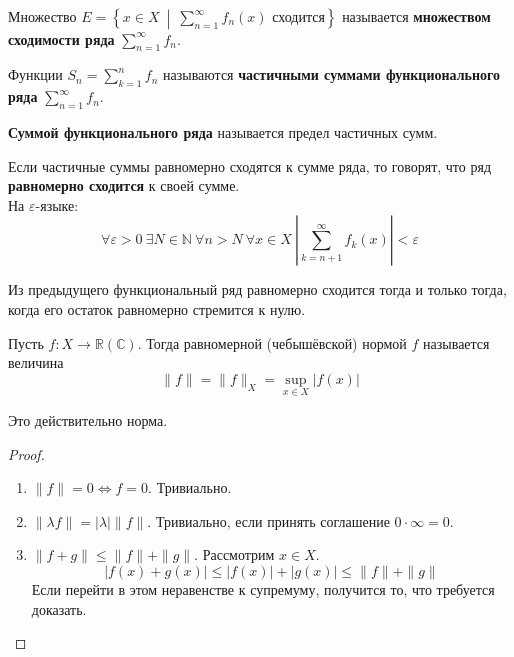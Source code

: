 \documentclass{article}
\let\eps\varepsilon
\begin{document}
    \begin{definition}
        Множество $E=\left\{x\in X~\middle|~\sum\limits_{n=1}^\infty f_n(x)\text{ сходится}\right\}$ называется \textbf{множеством сходимости ряда} $\sum\limits_{n=1}^\infty f_n$.
    \end{definition}
    \begin{definition}
        Функции $S_n=\sum\limits_{k=1}^n f_n$ называются \textbf{частичными суммами функционального ряда} $\sum\limits_{n=1}^\infty f_n$.
    \end{definition}
    \begin{definition}
        \textbf{Суммой функционального ряда} называется предел частичных сумм.
    \end{definition}
    \begin{definition}
        Если частичные суммы равномерно сходятся к сумме ряда, то говорят, что ряд \textbf{равномерно сходится} к своей сумме.\\
        На $\eps$-языке:
        $$
        \forall\eps>0~\exists N\in\mathbb N~\forall n>N~\forall x\in X~\left|\sum\limits_{k=n+1}^\infty f_k(x)\right|<\eps
        $$
    \end{definition}
    \begin{claim}
        Из предыдущего функциональный ряд равномерно сходится тогда и только тогда, когда его остаток равномерно стремится к нулю.
    \end{claim}
    \begin{definition}
        Пусть $f\colon X\to\mathbb R(\mathbb C)$. Тогда равномерной (чебышёвской) нормой $f$ называется величина
        $$
        \|f\|=\|f\|_X=\sup\limits_{x\in X}|f(x)|
        $$
    \end{definition}
    \begin{property}
        Это действительно норма.
    \end{property}
    \begin{proof}
        \begin{enumerate}
            \item $\|f\|=0\Leftrightarrow f=0$. Тривиально.
            \item $\|\lambda f\|=|\lambda|\|f\|$. Тривиально, если принять соглашение $0\cdot\infty=0$.
            \item $\|f+g\|\leqslant\|f\|+\|g\|$. Рассмотрим $x\in X$.
            $$
            |f(x)+g(x)|\leqslant|f(x)|+|g(x)|\leqslant\|f\|+\|g\|
            $$
            Если перейти в этом неравенстве к супремуму, получится то, что требуется доказать.
        \end{enumerate}
    \end{proof}
\end{document}
